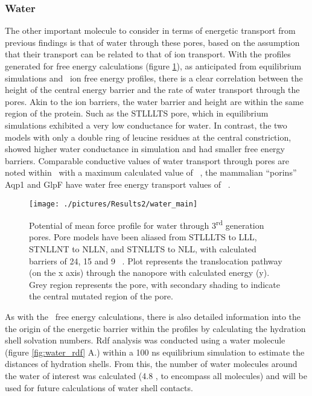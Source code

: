 \subsubsection{Water}

The other important molecule to consider in terms of energetic transport from previous findings is that of water through these pores, based on the assumption that their transport can be related to that of ion transport. With the profiles generated for free energy calculations (figure \ref{fig:water_main}), as anticipated from equilibrium simulations and \Cl\ ion free energy profiles, there is a clear correlation between the height of the central energy barrier and the rate of water transport through the pores. Akin to the ion barriers, the water barrier and height are within the same region of the protein. Such as the STLLLTS pore, which in equilibrium simulations exhibited a very low conductance for water. In contrast, the two models with only a double ring of leucine residues at the central constriction, showed higher water conductance in simulation and had smaller free energy barriers. Comparable conductive values of water transport through pores are noted within \ahl\ with a maximum calculated value of  \kj\ \cite{Wong-ekkabut2015}, the mammalian ``porins'' Aqp1 and GlpF have water free energy transport values of  \kj\ \cite{DeGroot2001}. 

\begin{figure}[H]
\begin{center}
\texttt{[image: ./pictures/Results2/water\_main]}
\caption[Potential of mean force profile for water through 3\textsuperscript{rd} generation pores.] {Potential of mean force profile for water through 3\textsuperscript{rd} generation pores. Pore models have been aliased from STLLLTS to LLL, STNLLNT to NLLN, and STNLLTS to NLL, with calculated barriers of 24, 15 and 9 \kj\ . Plot represents the translocation pathway (on the x axis) through the nanopore with calculated energy (y). Grey region represents the pore, with secondary shading to indicate the central mutated region of the pore.}  %
\label{fig:water_main}
\end{center}
\end{figure}

As with the \Cl\ free energy calculations, there is also detailed information into the the origin of the energetic barrier within the profiles by calculating the hydration shell solvation numbers. Rdf analysis was conducted using a water molecule  (figure \ref{fig:water_rdf} A.) within a 100 ns equilibrium simulation to estimate the distances of hydration shells. From this, the number of water molecules around the water of interest was calculated  (4.8 \angstrom, to encompass all molecules) and will be used for future calculations of water shell contacts. 

